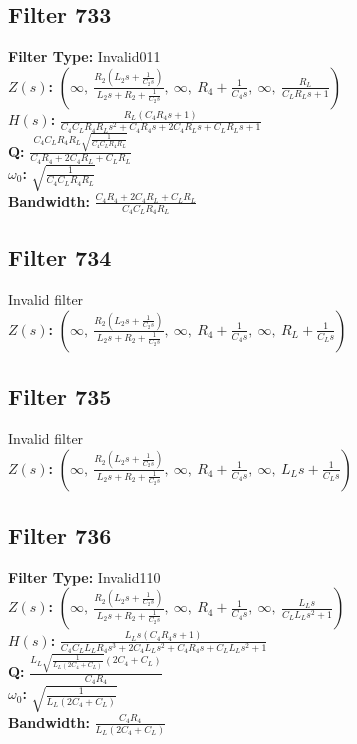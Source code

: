 \documentclass{article}
\begin{document}
\subsection*{Filter 733}
\textbf{Filter Type:} Invalid011 \\ 
\textbf{$Z(s)$:} $\left( \infty, \  \frac{R_{2} \left(L_{2} s + \frac{1}{C_{2} s}\right)}{L_{2} s + R_{2} + \frac{1}{C_{2} s}}, \  \infty, \  R_{4} + \frac{1}{C_{4} s}, \  \infty, \  \frac{R_{L}}{C_{L} R_{L} s + 1}\right)$ \\ 
\textbf{$H(s)$:} $\frac{R_{L} \left(C_{4} R_{4} s + 1\right)}{C_{4} C_{L} R_{4} R_{L} s^{2} + C_{4} R_{4} s + 2 C_{4} R_{L} s + C_{L} R_{L} s + 1}$ \\ 
\textbf{Q:} $\frac{C_{4} C_{L} R_{4} R_{L} \sqrt{\frac{1}{C_{4} C_{L} R_{4} R_{L}}}}{C_{4} R_{4} + 2 C_{4} R_{L} + C_{L} R_{L}}$ \\ 
\textbf{$\omega_0$:} $\sqrt{\frac{1}{C_{4} C_{L} R_{4} R_{L}}}$ \\ 
\textbf{Bandwidth:} $\frac{C_{4} R_{4} + 2 C_{4} R_{L} + C_{L} R_{L}}{C_{4} C_{L} R_{4} R_{L}}$ \\ 
\subsection*{Filter 734}
Invalid filter \\ 
\textbf{$Z(s)$:} $\left( \infty, \  \frac{R_{2} \left(L_{2} s + \frac{1}{C_{2} s}\right)}{L_{2} s + R_{2} + \frac{1}{C_{2} s}}, \  \infty, \  R_{4} + \frac{1}{C_{4} s}, \  \infty, \  R_{L} + \frac{1}{C_{L} s}\right)$ \\ 
\subsection*{Filter 735}
Invalid filter \\ 
\textbf{$Z(s)$:} $\left( \infty, \  \frac{R_{2} \left(L_{2} s + \frac{1}{C_{2} s}\right)}{L_{2} s + R_{2} + \frac{1}{C_{2} s}}, \  \infty, \  R_{4} + \frac{1}{C_{4} s}, \  \infty, \  L_{L} s + \frac{1}{C_{L} s}\right)$ \\ 
\subsection*{Filter 736}
\textbf{Filter Type:} Invalid110 \\ 
\textbf{$Z(s)$:} $\left( \infty, \  \frac{R_{2} \left(L_{2} s + \frac{1}{C_{2} s}\right)}{L_{2} s + R_{2} + \frac{1}{C_{2} s}}, \  \infty, \  R_{4} + \frac{1}{C_{4} s}, \  \infty, \  \frac{L_{L} s}{C_{L} L_{L} s^{2} + 1}\right)$ \\ 
\textbf{$H(s)$:} $\frac{L_{L} s \left(C_{4} R_{4} s + 1\right)}{C_{4} C_{L} L_{L} R_{4} s^{3} + 2 C_{4} L_{L} s^{2} + C_{4} R_{4} s + C_{L} L_{L} s^{2} + 1}$ \\ 
\textbf{Q:} $\frac{L_{L} \sqrt{\frac{1}{L_{L} \left(2 C_{4} + C_{L}\right)}} \left(2 C_{4} + C_{L}\right)}{C_{4} R_{4}}$ \\ 
\textbf{$\omega_0$:} $\sqrt{\frac{1}{L_{L} \left(2 C_{4} + C_{L}\right)}}$ \\ 
\textbf{Bandwidth:} $\frac{C_{4} R_{4}}{L_{L} \left(2 C_{4} + C_{L}\right)}$ \\ 
\end{document}
